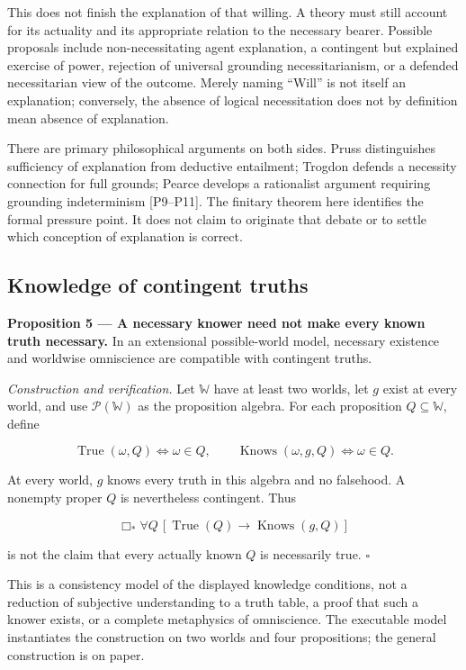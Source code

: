 \documentclass[11pt,a4paper]{article}
\begin{document}
This does not finish the explanation of that willing. A theory must
still account for its actuality and its appropriate relation to the
necessary bearer. Possible proposals include non-necessitating agent
explanation, a contingent but explained exercise of power, rejection of
universal grounding necessitarianism, or a defended necessitarian view
of the outcome. Merely naming ``Will'' is not itself an explanation;
conversely, the absence of logical necessitation does not by definition
mean absence of explanation.

There are primary philosophical arguments on both sides. Pruss
distinguishes sufficiency of explanation from deductive entailment;
Trogdon defends a necessity connection for full grounds; Pearce develops
a rationalist argument requiring grounding indeterminism {[}P9--P11{]}.
The finitary theorem here identifies the formal pressure point. It does
not claim to originate that debate or to settle which conception of
explanation is correct.

\subsection{Knowledge of contingent
truths}\label{knowledge-of-contingent-truths}


\textbf{Proposition 5 --- A necessary knower need not make every known
truth necessary.} In an extensional possible-world model, necessary
existence and worldwise omniscience are compatible with contingent
truths.

\emph{Construction and verification.} Let \(\mathbb W\) have at least
two worlds, let \(g\) exist at every world, and use
\(\mathcal P(\mathbb W)\) as the proposition algebra. For each
proposition \(Q\subseteq\mathbb W\), define

\nopagebreak[4]

\[
\operatorname{True}(\omega,Q)\iff\omega\in Q,
\qquad
\operatorname{Knows}(\omega,g,Q)\iff\omega\in Q.
\]

At every world, \(g\) knows every truth in this algebra and no
falsehood. A nonempty proper \(Q\) is nevertheless contingent. Thus

\nopagebreak[4]

\[
\Box_*\forall Q\,[\operatorname{True}(Q)\to\operatorname{Knows}(g,Q)]
\]

is not the claim that every actually known \(Q\) is necessarily true.
\(\square\)

This is a consistency model of the displayed knowledge conditions, not a
reduction of subjective understanding to a truth table, a proof that
such a knower exists, or a complete metaphysics of omniscience. The
executable model instantiates the construction on two worlds and four
propositions; the general construction is on paper.
\end{document}
